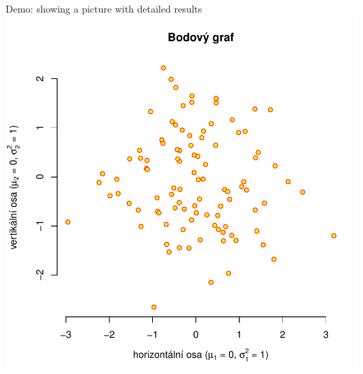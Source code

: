 \documentclass[aspectratio=169]{beamer}
\begin{document}
\begin{frame}{Demo: showing a picture with detailed results}
\centering
\includegraphics[height=0.8\textheight]{img/ukazka-obr01.pdf}
\end{frame}
\end{document}
